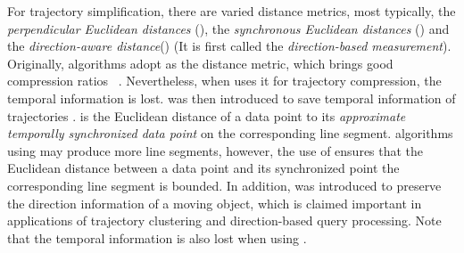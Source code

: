 %
For trajectory simplification, there are varied distance metrics, most typically, the \emph{perpendicular Euclidean distances} (\ped), the \emph{synchronous Euclidean distances}\cite{Meratnia:Spatiotemporal} (\sed) and the \emph{direction-aware distance}\cite{Zhang:Evaluation}(\dad) (It is first called the \emph{direction-based measurement}\cite{Long:Direction}).
Originally, \lsa algorithms adopt \ped as the distance metric, which brings good compression ratios~ \cite{Douglas:Peucker, Hershberger:Speeding, Liu:BQS, Muckell:Compression, Chen:Trajectory, Cao:Spatio, Shi:Survey}. Nevertheless, when uses it for trajectory compression, the temporal information is lost.
%
\sed was then introduced to save temporal information of trajectories \cite{Meratnia:Spatiotemporal}. \sed is the Euclidean distance of a data point to its \emph{approximate temporally synchronized data point} \cite{Meratnia:Spatiotemporal} on the corresponding line segment.
\lsa algorithms using \sed may produce more line segments, however, the use of \sed ensures that the Euclidean distance between a data point and its synchronized point \wrt the corresponding line segment is bounded.
%
In addition, \dad\cite{Long:Direction, Zhang:Evaluation} was introduced to preserve the direction information of a moving object, which is claimed important in applications of trajectory clustering and direction-based query processing\cite{Long:Direction}. Note that the temporal information is also lost when using \dad.

